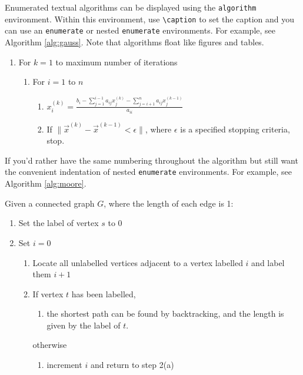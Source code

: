 \documentclass[ml4h-mathphys]{ml4h-jnl}%
\theoremstyle{thmstyleone}%
\theoremstyle{thmstyletwo}%
\theoremstyle{thmstylethree}%
\begin{document}
Enumerated textual algorithms can be displayed using the
\texttt{algorithm} environment. Within this environment, use
\verb|\caption| to set the caption and you can use an
\texttt{enumerate} or nested \texttt{enumerate} environments.
For example, see Algorithm \ref{alg:gauss}. Note that algorithms
float like figures and tables.

\begin{algorithm}[htbp]
{ %
  {\caption{The Gauss-Seidel Algorithm}\label{alg:gauss}}%
{%
\begin{enumerate}
  \item For $k=1$ to maximum number of iterations
    \begin{enumerate}
      \item For $i=1$ to $n$
        \begin{enumerate}
        \item $x_i^{(k)} = 
          \frac{b_i - \sum_{j=1}^{i-1}a_{ij}x_j^{(k)}
          - \sum_{j=i+1}^{n}a_{ij}x_j^{(k-1)}}{a_{ii}}$
        \item If $\|\vec{x}^{(k)}-\vec{x}^{(k-1)} < \epsilon\|$,
          where $\epsilon$ is a specified stopping criteria, stop.
      \end{enumerate}
    \end{enumerate}
\end{enumerate}}
}%
\end{algorithm}

If you'd rather have the same numbering throughout the algorithm
but still want the convenient indentation of nested 
\texttt{enumerate} environments. For example, see Algorithm \ref{alg:moore}.

\begin{algorithm}
  {\caption{Moore's Shortest Path} \label{alg:moore}}%
{%
Given a connected graph $G$, where the length of each edge is 1:
\begin{enumerate}
  \item Set the label of vertex $s$ to 0
  \item Set $i=0$
  \begin{enumerate}
    \item \label{step:locate}Locate all unlabelled vertices 
          adjacent to a vertex labelled $i$ and label them $i+1$
    \item If vertex $t$ has been labelled,
    \begin{enumerate}
      \item[] the shortest path can be found by backtracking, and 
      the length is given by the label of $t$.
    \end{enumerate}
    otherwise
    \begin{enumerate}
      \item[] increment $i$ and return to step 2(a)
    \end{enumerate}
  \end{enumerate}
\end{enumerate}
}%
\end{algorithm}
\end{document}
